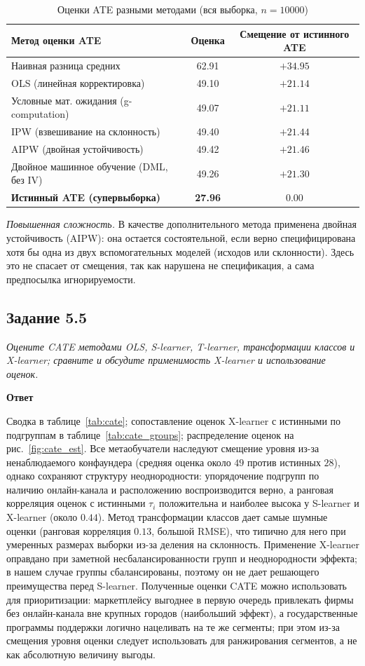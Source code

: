 \documentclass[12pt,a4paper]{article}
\newcommand{\zadanie}[2]{\subsection*{Задание #1}\begingroup\itshape #2\par\endgroup\medskip}
\newcommand{\otvet}{\par\noindent\textbf{Ответ}\par\medskip}
\begin{document}
\begin{table}[H]\centering\small
\caption{Оценки ATE разными методами (вся выборка, $n=10000$)}\label{tab:ate}
\begin{tabular}{lcc}\toprule
Метод оценки ATE & Оценка & Смещение от истинного ATE\\\midrule
Наивная разница средних & 62.91 & $+34.95$\\
OLS (линейная корректировка) & 49.10 & $+21.14$\\
Условные мат. ожидания (g-computation) & 49.07 & $+21.11$\\
IPW (взвешивание на склонность) & 49.40 & $+21.44$\\
AIPW (двойная устойчивость) & 49.42 & $+21.46$\\
Двойное машинное обучение (DML, без IV) & 49.26 & $+21.30$\\
\textbf{Истинный ATE (супервыборка)} & \textbf{27.96} & $0.00$\\\bottomrule
\end{tabular}
\end{table}

\textit{Повышенная сложность.} В качестве дополнительного метода применена двойная устойчивость (AIPW): она остается состоятельной, если верно специфицирована хотя бы одна из двух вспомогательных моделей (исходов или склонности). Здесь это не спасает от смещения, так как нарушена не спецификация, а сама предпосылка игнорируемости.

\zadanie{5.5}{Оцените CATE методами OLS, S-learner, T-learner, трансформации классов и X-learner; сравните и обсудите применимость X-learner и использование оценок.}
\otvet
Сводка в таблице~\ref{tab:cate}; сопоставление оценок X-learner с истинными по подгруппам в таблице~\ref{tab:cate_groups}; распределение оценок на рис.~\ref{fig:cate_est}. Все метаобучатели наследуют смещение уровня из-за ненаблюдаемого конфаундера (средняя оценка около $49$ против истинных $28$), однако сохраняют структуру неоднородности: упорядочение подгрупп по наличию онлайн-канала и расположению воспроизводится верно, а ранговая корреляция оценок с истинными $\tau_i$ положительна и наиболее высока у S-learner и X-learner (около $0.44$). Метод трансформации классов дает самые шумные оценки (ранговая корреляция $0.13$, большой RMSE), что типично для него при умеренных размерах выборки из-за деления на склонность. Применение X-learner оправдано при заметной несбалансированности групп и неоднородности эффекта; в нашем случае группы сбалансированы, поэтому он не дает решающего преимущества перед S-learner. Полученные оценки CATE можно использовать для приоритизации: маркетплейсу выгоднее в первую очередь привлекать фирмы без онлайн-канала вне крупных городов (наибольший эффект), а государственные программы поддержки логично нацеливать на те же сегменты; при этом из-за смещения уровня оценки следует использовать для ранжирования сегментов, а не как абсолютную величину выгоды.
\end{document}
